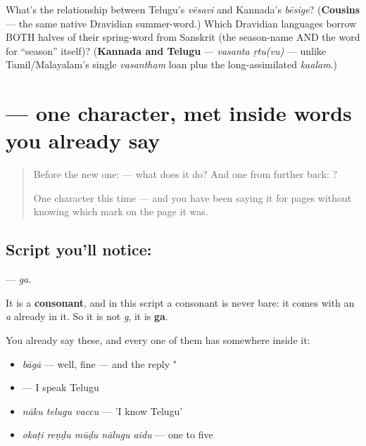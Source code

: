 \begin{tcolorbox}[breakable,colback=teal!4,colframe=teal!35!black,title={Before you move on}]
What's the relationship between Telugu's \emph{vēsavi} and Kannada's \emph{bēsige}? (\textbf{Cousins} — the same native Dravidian summer-word.) Which Dravidian languages borrow BOTH halves of their spring-word from Sanskrit (the season-name AND the word for \textquotedblleft{}season\textquotedblright{} itself)? (\textbf{Kannada and Telugu} — \emph{vasanta ṛtu(vu)} — unlike Tamil/Malayalam's single \emph{vasantham} loan plus the long-assimilated \emph{kaalam}.)
\end{tcolorbox}
\section[\texorpdfstring{\te{గ} (ga)}{గ (ga)}]{ — one character, met inside words you already say}

\label{lesson:TE-S118-letter-ga}



\begin{quote}
Before the new one:  — what does it do? And one from further back: ?

One character this time — and you have been saying it for pages without knowing which mark on the page it was.
\end{quote}

\subsection*{Script you'll notice: }
\textbf{} — \emph{ga}.

It is a \textbf{consonant}, and in this script a consonant is never bare: it comes with an \emph{a} already in it. So it is not \emph{g}, it is \textbf{ga}.

You already say these, and every one of them has  somewhere inside it:

\begin{itemize}
\raggedright
  \item \textbf{} \emph{bāgā} — well, fine — and the reply " 
  \item \textbf{  } — I speak Telugu
  \item \textbf{  } \emph{nāku telugu vaccu} — 'I know Telugu'
  \item \textbf{    } \emph{okaṭi reṇḍu mūḍu nālugu aidu} — one to five
\end{itemize}

